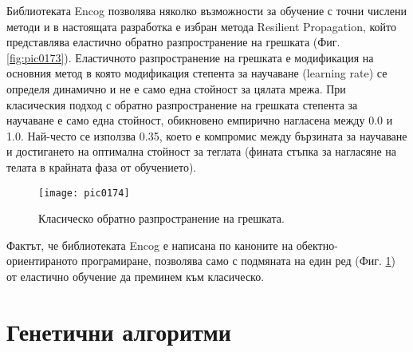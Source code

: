 Библиотеката Encog позволява няколко възможности за обучение с точни числени методи и в настоящата разработка е избран метода Resilient Propagation, който представлява еластично обратно разпространение на грешката (Фиг. \ref{fig:pic0173}). Еластичното разпространение на грешката е модификация на основния метод в която модификация степента за научаване (learning rate) се определя динамично и не е само една стойност за цялата мрежа. При класическия подход с обратно разпространение на грешката степента за научаване е само една стойност, обикновено емпирично нагласена между 0.0 и 1.0. Най-често се използва 0.35, което е компромис между бързината за научаване и достигането на оптимална стойност за теглата (фината стъпка за нагласяне на телата в крайната фаза от обучението).

\begin{figure}[h]
  \centering
  \texttt{[image: pic0174]}
  \caption{Класическо обратно разпространение на грешката.}
\label{fig:pic0174}
\end{figure}
\FloatBarrier

Фактът, че библиотеката Encog е написана по каноните на обектно-ориентираното програмиране, позволява само с подмяната на един ред (Фиг. \ref{fig:pic0174}) от еластично обучение да преминем към класическо. 

\section{Генетични алгоритми}
